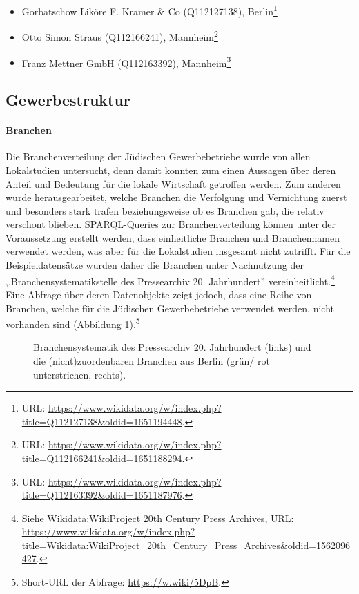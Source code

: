 \begin{itemize}
    \item Gorbatschow Liköre F. Kramer \& Co (Q112127138), Berlin\footnote{URL: \url{https://www.wikidata.org/w/index.php?title=Q112127138\&oldid=1651194448}.}
    \item Otto Simon Straus (Q112166241), Mannheim\footnote{URL: \url{https://www.wikidata.org/w/index.php?title=Q112166241\&oldid=1651188294}.}
    \item Franz Mettner GmbH (Q112163392), Mannheim\footnote{URL: \url{https://www.wikidata.org/w/index.php?title=Q112163392\&oldid=1651187976}.}
\end{itemize}

\subsection{Gewerbestruktur}

\paragraph{Branchen} Die Branchenverteilung der Jüdischen Gewerbebetriebe wurde von allen Lokalstudien untersucht, denn damit konnten zum einen Aussagen über deren Anteil und Bedeutung für die lokale Wirtschaft getroffen werden. Zum anderen wurde herausgearbeitet, welche Branchen die Verfolgung und Vernichtung zuerst und besonders stark trafen beziehungsweise ob es Branchen gab, die relativ verschont blieben. SPARQL-Queries zur Branchenverteilung können unter der Voraussetzung erstellt werden, dass einheitliche Branchen und Branchennamen verwendet werden, was aber für die Lokalstudien insgesamt nicht zutrifft. Für die Beispieldatensätze wurden daher die Branchen unter Nachnutzung der ,,Branchensystematikstelle des Pressearchiv 20. Jahrhundert'' vereinheitlicht.\footnote{Siehe Wikidata:WikiProject 20th Century Press Archives, URL: \url{https://www.wikidata.org/w/index.php?title=Wikidata:WikiProject\_20th\_Century\_Press\_Archives\&oldid=1562096427}.} Eine Abfrage über deren Datenobjekte zeigt jedoch, dass eine Reihe von Branchen, welche für die Jüdischen Gewerbebetriebe verwendet werden, nicht vorhanden sind (Abbildung \ref{fig:wikidatasectors}).\footnote{Short-URL der Abfrage: \url{https://w.wiki/5DpB}.} 

\begin{figure}[h]
    \centering
    \caption[Branchensystematik]{Branchensystematik des Pressearchiv 20. Jahrhundert (links) und die (nicht)zuordenbaren Branchen aus Berlin (grün/ rot unterstrichen, rechts).}
    \label{fig:wikidatasectors}
\end{figure}

